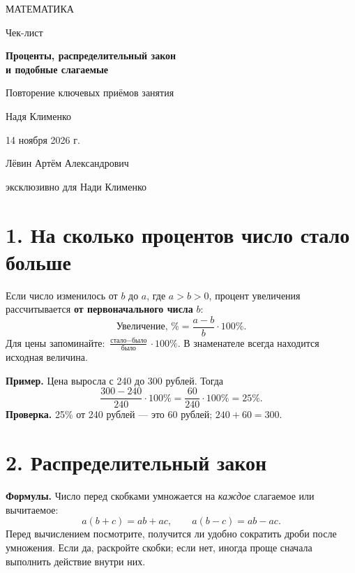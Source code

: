 \documentclass[a4paper,12pt]{article}
\newcommand{\sect}[1]{\Needspace{8\baselineskip}\section*{\color{darkaccent}#1}\vspace{-2mm}\noindent{\color{softline}\rule{\linewidth}{0.5pt}}\vspace{1mm}}
\newcommand{\markkey}[1]{\textcolor{darkaccent}{\textbf{#1}}}
\begin{document}
\begin{titlepage}
\thispagestyle{empty}
\centering
\vspace*{21mm}
{\Large\color{darkaccent} МАТЕМАТИКА\par}
\vspace{20mm}
{\LARGE\color{textgray} Чек-лист\par}
\vspace{12mm}
{\LARGE\bfseries\color{accent} Проценты, распределительный закон\\[3mm] и подобные слагаемые\par}
\vspace{13mm}
{\large Повторение ключевых приёмов занятия\par}
\vfill
{\large Надя Клименко\par}
\vspace{10mm}
{\normalsize 14 ноября 2026 г.\par}
\vspace{17mm}
{\small Лёвин Артём Александрович\par}
{\small эксклюзивно для Нади Клименко\par}
\vspace{16mm}
\vspace{3mm}
\end{titlepage}
\setcounter{page}{1}

\sect{1. На сколько процентов число стало больше}
Если число изменилось от \(b\) до \(a\), где \(a>b>0\), процент увеличения рассчитывается \textbf{от первоначального числа} \(b\):
\[
\boxed{\text{Увеличение, \%}=\frac{a-b}{b}\cdot100\%.}
\]
Для цены запоминайте: \(\displaystyle\frac{\text{стало}-\text{было}}{\text{было}}\cdot100\%\). В знаменателе всегда находится исходная величина.

\markkey{Пример.} Цена выросла с 240 до 300 рублей. Тогда
\[
\frac{300-240}{240}\cdot100\%=\frac{60}{240}\cdot100\%=25\%.
\]
\markkey{Проверка.} 25\% от 240 рублей --- это 60 рублей; \(240+60=300\).

\sect{2. Распределительный закон}
\markkey{Формулы.} Число перед скобками умножается на \emph{каждое} слагаемое или вычитаемое:
\[
\boxed{a(b+c)=ab+ac,\qquad a(b-c)=ab-ac.}
\]
Перед вычислением посмотрите, получится ли удобно сократить дроби после умножения. Если да, раскройте скобки; если нет, иногда проще сначала выполнить действие внутри них.
\end{document}
